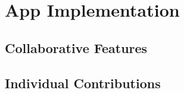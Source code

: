 \section{App Implementation}

\subsection{Collaborative Features}

\subsection{Individual Contributions}